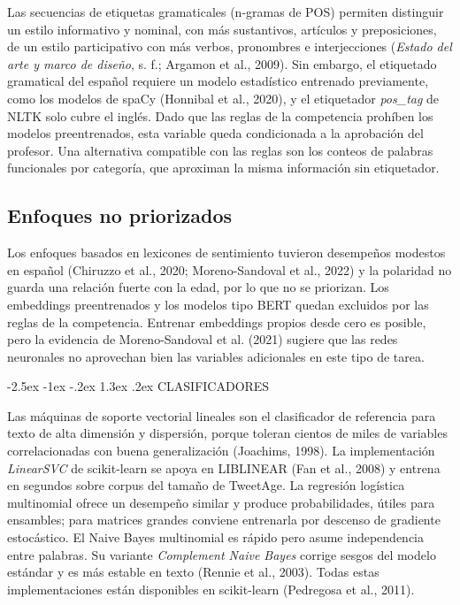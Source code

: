 \documentclass[10pt,twocolumn]{article}
\makeatletter
\renewcommand{\section}{\@startsection{section}{1}{\z@}%
  {-2.5ex \@plus -1ex \@minus -.2ex}%
  {1.3ex \@plus .2ex}%
  {\normalfont\large\bfseries\centering}}
\makeatother
\begin{document}
Las secuencias de etiquetas gramaticales (n-gramas de POS) permiten distinguir un estilo informativo y nominal, con más sustantivos, artículos y preposiciones, de un estilo participativo con más verbos, pronombres e interjecciones (\textit{Estado del arte y marco de diseño}, s. f.; Argamon et al., 2009). Sin embargo, el etiquetado gramatical del español requiere un modelo estadístico entrenado previamente, como los modelos de spaCy (Honnibal et al., 2020), y el etiquetador \textit{pos\_tag} de NLTK solo cubre el inglés. Dado que las reglas de la competencia prohíben los modelos preentrenados, esta variable queda condicionada a la aprobación del profesor. Una alternativa compatible con las reglas son los conteos de palabras funcionales por categoría, que aproximan la misma información sin etiquetador.


\subsection{Enfoques no priorizados}\label{sec:5.6}

Los enfoques basados en lexicones de sentimiento tuvieron desempeños modestos en español (Chiruzzo et al., 2020; Moreno-Sandoval et al., 2022) y la polaridad no guarda una relación fuerte con la edad, por lo que no se priorizan. Los embeddings preentrenados y los modelos tipo BERT quedan excluidos por las reglas de la competencia. Entrenar embeddings propios desde cero es posible, pero la evidencia de Moreno-Sandoval et al. (2021) sugiere que las redes neuronales no aprovechan bien las variables adicionales en este tipo de tarea.


\section{CLASIFICADORES}\label{sec:6}

Las máquinas de soporte vectorial lineales son el clasificador de referencia para texto de alta dimensión y dispersión, porque toleran cientos de miles de variables correlacionadas con buena generalización (Joachims, 1998). La implementación \textit{LinearSVC} de scikit-learn se apoya en LIBLINEAR (Fan et al., 2008) y entrena en segundos sobre corpus del tamaño de TweetAge. La regresión logística multinomial ofrece un desempeño similar y produce probabilidades, útiles para ensambles; para matrices grandes conviene entrenarla por descenso de gradiente estocástico. El Naive Bayes multinomial es rápido pero asume independencia entre palabras. Su variante \textit{Complement Naive Bayes} corrige sesgos del modelo estándar y es más estable en texto (Rennie et al., 2003). Todas estas implementaciones están disponibles en scikit-learn (Pedregosa et al., 2011).
\end{document}
